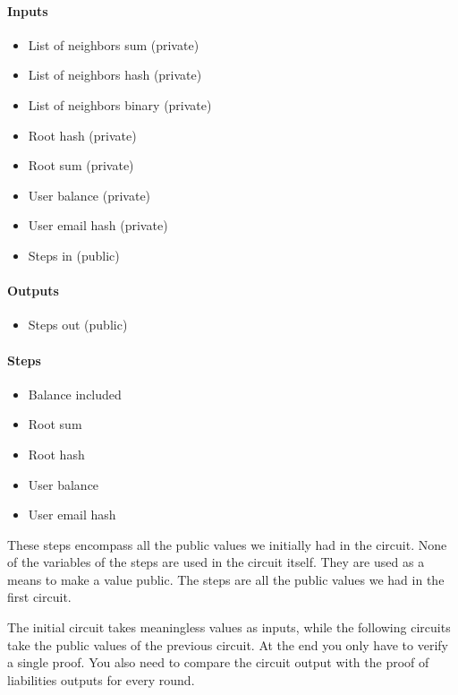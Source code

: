\paragraph{Inputs}
\begin{itemize}

   \item List of neighbors sum (private)
   \item List of neighbors hash (private)
   \item List of neighbors binary (private)
   \item Root hash (private)
   \item Root sum (private)
   \item User balance (private)
   \item User email hash (private)
   \item Steps in (public)
  
   \end{itemize}

\paragraph{Outputs}
\begin{itemize}
   \item Steps out (public)
   \end{itemize}

\paragraph{Steps}
\begin{itemize}
   \item Balance included
   \item Root sum
   \item Root hash
   \item User balance
   \item User email hash
   \end{itemize}
These steps encompass all the public values we initially had in the circuit.
None of the variables of the steps are used in the circuit itself. They are used as a means to make a value public.
The steps are all the public values we had in the first circuit.

The initial circuit takes meaningless values as inputs, while the following circuits take the public values of the previous circuit.
At the end you only have to verify a single proof. You also need to compare the circuit output with the proof of liabilities outputs for every round.



